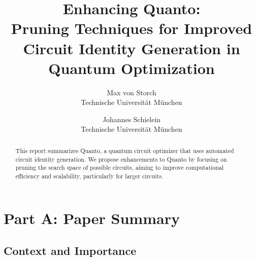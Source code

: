 \renewcommand\theadalign{bc}
\renewcommand\theadfont{\bfseries}

\usepackage{filecontents}





\title{\Large \bf Enhancing Quanto:\\Pruning Techniques for Improved Circuit Identity Generation in Quantum Optimization}

\author{
{\rm Max von Storch}\\
Technische Universität München
\and
{\rm Johannes Schielein}\\
Technische Universität München
} %

\maketitle

\begin{abstract}
This report summarizes Quanto, a quantum circuit optimizer that uses automated circuit identity generation. We propose enhancements to Quanto by focusing on pruning the search space of possible circuits, aiming to improve computational efficiency and scalability, particularly for larger circuits.  
\end{abstract}


\section{Part A: Paper Summary}

\subsection{Context and Importance}

